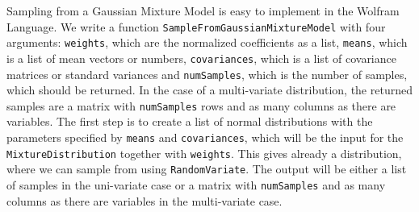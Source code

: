 \documentclass{tstextbook}
\begin{document}
\begin{example}
Sampling from a Gaussian Mixture Model is easy to implement in the Wolfram Language. We write a function \texttt{SampleFromGaussianMixtureModel} with four arguments: \texttt{weights}, which are the normalized coefficients as a list, \texttt{means}, which is a list of mean vectors or numbers, \texttt{covariances}, which is a list of covariance matrices or standard variances and \texttt{numSamples}, which is the number of samples, which should be returned. In the case of a multi-variate distribution, the returned samples are a matrix with \texttt{numSamples} rows and as many columns as there are variables. The first step is to create a list of normal distributions with the parameters specified by \texttt{means} and \texttt{covariances}, which will be the input for the \texttt{MixtureDistribution} together with \texttt{weights}. This gives already a distribution, where we can sample from using \texttt{RandomVariate}.
The output will be either a list of samples in the uni-variate case or a matrix with \texttt{numSamples} and as many columns as there are variables in the multi-variate case.
  


\end{example}
\end{document}
